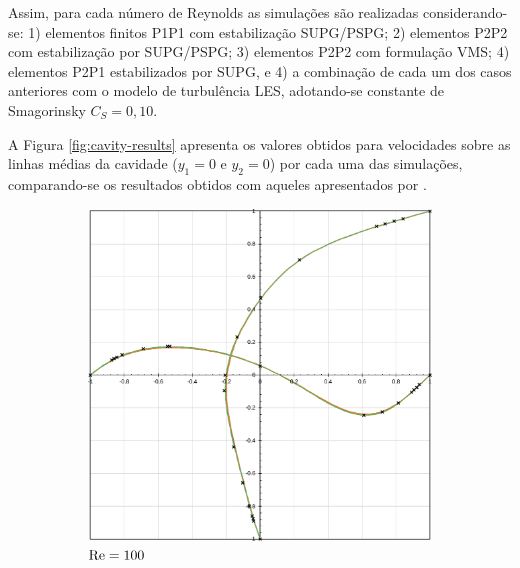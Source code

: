 Assim, para cada número de Reynolds as simulações são realizadas considerando-se: 1) elementos finitos P1P1 com estabilização SUPG/PSPG; 2) elementos P2P2 com estabilização por SUPG/PSPG; 3) elementos P2P2 com formulação VMS; 4) elementos P2P1 estabilizados por SUPG, e 4) a combinação de cada um dos casos anteriores com o modelo de turbulência LES, adotando-se constante de Smagorinsky $C_S=0,10$.


A Figura \ref{fig:cavity-results} apresenta os valores obtidos para velocidades sobre as linhas médias da cavidade ($y_1=0$ e $y_2=0$) por cada uma das simulações, comparando-se os resultados obtidos com aqueles apresentados por .

\begin{figure}[h!]
    \centering
    \caption{Cavidade bidimensional - distribuição de velocidade sobre as linhas médias.}
    \begin{subfigure}{0.4\textwidth}
        \includegraphics[width=\linewidth]{Figuras/Cavity/Re100.pdf}
        \caption{$\mathrm{Re}=100$}
    \end{subfigure}
    \begin{subfigure}{0.4\textwidth}

\end{subfigure}
\end{figure}
